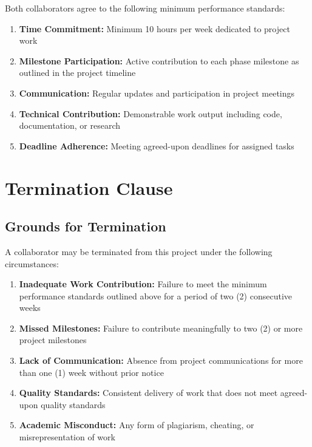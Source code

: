 \documentclass[12pt,a4paper]{article}
\begin{document}
Both collaborators agree to the following minimum performance standards:

\begin{enumerate}
    \item \textbf{Time Commitment:} Minimum 10 hours per week dedicated to project work
    \item \textbf{Milestone Participation:} Active contribution to each phase milestone as outlined in the project timeline
    \item \textbf{Communication:} Regular updates and participation in project meetings
    \item \textbf{Technical Contribution:} Demonstrable work output including code, documentation, or research
    \item \textbf{Deadline Adherence:} Meeting agreed-upon deadlines for assigned tasks
\end{enumerate}

\vspace{1cm}

\section*{Termination Clause}

\subsection*{Grounds for Termination}

A collaborator may be terminated from this project under the following circumstances:

\begin{enumerate}
    \item \textbf{Inadequate Work Contribution:} Failure to meet the minimum performance standards outlined above for a period of two (2) consecutive weeks
    \item \textbf{Missed Milestones:} Failure to contribute meaningfully to two (2) or more project milestones
    \item \textbf{Lack of Communication:} Absence from project communications for more than one (1) week without prior notice
    \item \textbf{Quality Standards:} Consistent delivery of work that does not meet agreed-upon quality standards
    \item \textbf{Academic Misconduct:} Any form of plagiarism, cheating, or misrepresentation of work
\end{enumerate}
\end{document}
